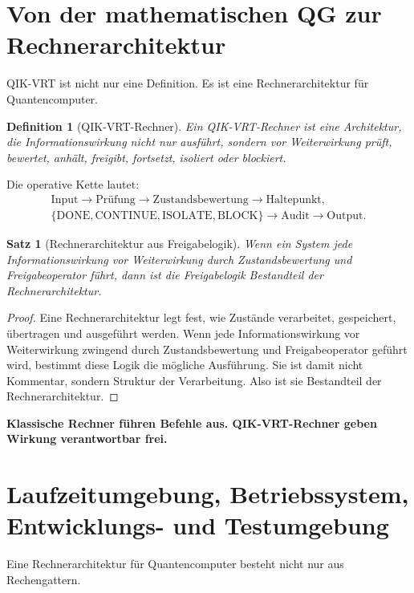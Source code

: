 \documentclass[11pt,a4paper,oneside]{scrartcl}
\theoremstyle{qikstyle}
\newtheorem{definition}{Definition}[section]
\newtheorem{satz}{Satz}[section]
\newcommand{\DONE}{\mathrm{DONE}}
\newcommand{\CONTINUE}{\mathrm{CONTINUE}}
\newcommand{\ISOLATE}{\mathrm{ISOLATE}}
\newcommand{\BLOCK}{\mathrm{BLOCK}}
\newenvironment{merksatz}{\begin{center}\begin{minipage}{0.92\linewidth}\sffamily\bfseries}{\end{minipage}\end{center}}
\begin{document}
\section{Von der mathematischen QG zur Rechnerarchitektur}

QIK-VRT ist nicht nur eine Definition. Es ist eine Rechnerarchitektur für Quantencomputer.

\begin{definition}[QIK-VRT-Rechner]
Ein QIK-VRT-Rechner ist eine Architektur, die Informationswirkung nicht nur ausführt, sondern vor Weiterwirkung prüft, bewertet, anhält, freigibt, fortsetzt, isoliert oder blockiert.
\end{definition}

Die operative Kette lautet:
\[
\begin{gathered}
\text{Input} \to \text{Prüfung} \to \text{Zustandsbewertung} \to \text{Haltepunkt},\\
\{\DONE,\CONTINUE,\ISOLATE,\BLOCK\} \to \text{Audit} \to \text{Output}.
\end{gathered}
\]

\begin{satz}[Rechnerarchitektur aus Freigabelogik]
Wenn ein System jede Informationswirkung vor Weiterwirkung durch Zustandsbewertung und Freigabeoperator führt, dann ist die Freigabelogik Bestandteil der Rechnerarchitektur.
\end{satz}

\begin{proof}
Eine Rechnerarchitektur legt fest, wie Zustände verarbeitet, gespeichert, übertragen und ausgeführt werden. Wenn jede Informationswirkung vor Weiterwirkung zwingend durch Zustandsbewertung und Freigabeoperator geführt wird, bestimmt diese Logik die mögliche Ausführung. Sie ist damit nicht Kommentar, sondern Struktur der Verarbeitung. Also ist sie Bestandteil der Rechnerarchitektur.
\end{proof}

\begin{merksatz}
Klassische Rechner führen Befehle aus. QIK-VRT-Rechner geben Wirkung verantwortbar frei.
\end{merksatz}
\newpage

\section{Laufzeitumgebung, Betriebssystem, Entwicklungs- und Testumgebung}

Eine Rechnerarchitektur für Quantencomputer besteht nicht nur aus Rechengattern.
\end{document}
